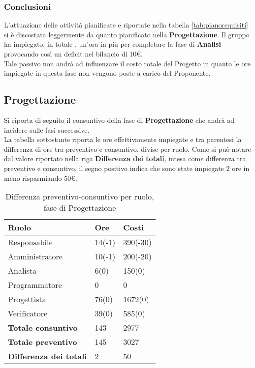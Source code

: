 \subsubsection{Conclusioni}
L'attuazione delle attività pianificate e riportate nella tabella \ref{tab:pianorequisiti} si è discostata leggermente da quanto pianificato nella \textbf{Progettazione}.
Il gruppo ha impiegato, in totale , un'ora in più per completare la fase di \textbf{Analisi} provocando così un deficit nel bilancio di 10\euro.\\
Tale passivo non andrà ad influenzare il costo totale del Progetto in quanto le ore impiegate in questa fase non vengono poste a carico del Proponente.

\subsection{Progettazione}

Si riporta di seguito il consuntivo della fase di \textbf{Progettazione} che andrà ad incidere sulle fasi successive.\\
La tabella sottostante riporta le ore effettivamente impiegate e tra parentesi la differenza di ore tra preventivo e consuntivo, divise per ruolo. Come si può notare dal valore riportato nella riga \textbf{Differenza dei totali}, intesa come differenza tra preventivo e consuntivo, il segno positivo indica che sono state impiegate 2 ore in meno risparmiando 50\euro.

	\begin{table}[H]
		\centering
	  \begin{tabular}{p{}p{}
		    							p{}}
		   \toprule Ruolo & Ore & Costi \\
		   \midrule
		   Responsabile & 14(-1) & 390(-30) \\
		   Amministratore & 10(-1) & 200(-20) \\
		   Analista & 6(0) & 150(0) \\
		   Programmatore & 0 & 0 \\
		   Progettista & 76(0) & 1672(0) \\
		   Verificatore & 39(0) & 585(0) \\
		   \hline
		   \textbf{Totale consuntivo} & 143 & 2977 \\
		   \textbf{Totale preventivo} & 145 & 3027 \\
		   \textbf{Differenza dei totali} & 2 & 50 \\
		   \bottomrule
	 \end{tabular}
	 	\label{tab:costuntivoProgettazione}
	 	\caption{Differenza preventivo-consuntivo per ruolo, fase di Progettazione}
	\end{table}

